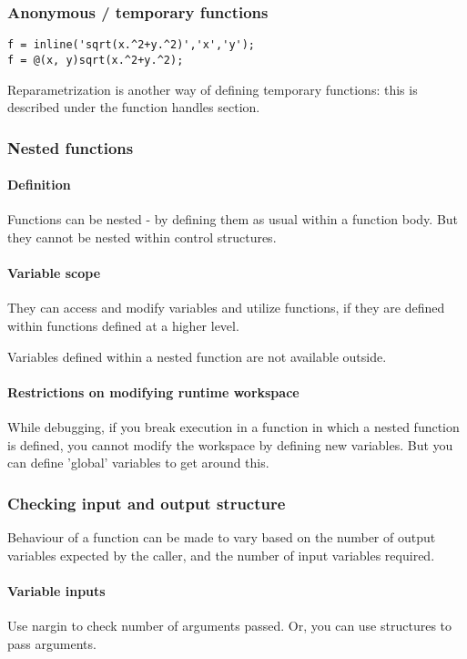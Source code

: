 \documentclass[oneside, article]{memoir}
\begin{document}
\subsubsection{Anonymous / temporary functions}
\begin{lstlisting}
f = inline('sqrt(x.^2+y.^2)','x','y');
f = @(x, y)sqrt(x.^2+y.^2);
\end{lstlisting}

Reparametrization is another way of defining temporary functions: this is described under the function handles section.

\subsubsection{Nested functions}
\paragraph{Definition}
Functions can be nested - by defining them as usual within a function body. But they cannot be nested within control structures.

\paragraph{Variable scope}
They can access and modify variables and utilize functions, if they are defined within functions defined at a higher level.

Variables defined within a nested function are not available outside.

\paragraph{Restrictions on modifying runtime workspace}
While debugging, if you break execution in a function in which a nested function is defined, you cannot modify the workspace by defining new variables. But you can define 'global' variables to get around this.

\subsubsection{Checking input and output structure}
Behaviour of a function can be made to vary based on the number of output variables expected by the caller, and the number of input variables required.

\paragraph*{Variable inputs}
Use nargin to check number of arguments passed. Or, you can use structures to pass arguments.
\end{document}
